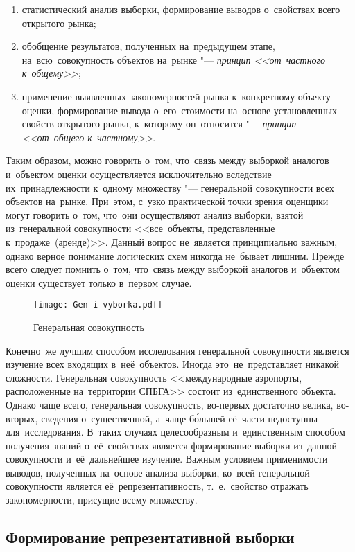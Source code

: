\documentclass[]{scrartcl}
\begin{document}
	\begin{enumerate}
		\item статистический анализ выборки, формирование выводов о~свойствах всего открытого рынка;
		\item обобщение результатов, полученных на~предыдущем этапе, на~всю~совокупность объектов на~рынке "--- \emph{принцип <<от~частного к~общему>>};
		\item применение выявленных закономерностей рынка к~конкретному объекту оценки, формирование вывода о~его~стоимости на~основе установленных свойств открытого рынка, к~которому он~относится "--- \emph{принцип <<от~общего к~частному>>}.
	\end{enumerate}
Таким образом, можно говорить о~том, что~связь между выборкой аналогов и~объектом оценки осуществляется исключительно вследствие их~принадлежности к~одному множеству "--- генеральной совокупности всех объектов на~рынке. При~этом, с~узко практической точки зрения оценщики могут говорить о~том, что~они осуществляют анализ выборки, взятой из~генеральной совокупности <<все~объекты, представленные к~продаже~(аренде)>>. Данный вопрос не~является принципиально важным, однако верное понимание логических схем никогда не~бывает лишним. Прежде всего следует помнить о~том, что~связь между выборкой аналогов и~объектом оценки существует только в~первом случае.
 \begin{figure}[ht]
\centering %
\texttt{[image: Gen-i-vyborka.pdf]}
\caption{Генеральная совокупность}\label{fig:Gen-sovokup}
\end{figure}
\par
Конечно~же лучшим способом исследования генеральной совокупности является изучение всех входящих в~неё~объектов. Иногда это~не~представляет никакой сложности. Генеральная совокупность <<международные аэропорты, расположенные на~территории СПБГА>> состоит из~единственного объекта. Однако чаще всего, генеральная совокупность, во-первых достаточно велика, во-вторых, сведения о~существенной, а~чаще б\'ольшей её~части недоступны для~исследования. В~таких случаях целесообразным и~единственным способом получения знаний о~её~свойствах является формирование выборки из~данной совокупности и~её~дальнейшее изучение. Важным условием применимости выводов, полученных на~основе анализа выборки, ко~всей генеральной совокупности является её~репрезентативность, т.~е.~свойство отражать закономерности, присущие всему множеству.

\subsection{Формирование репрезентативной выборки}
\end{document}
